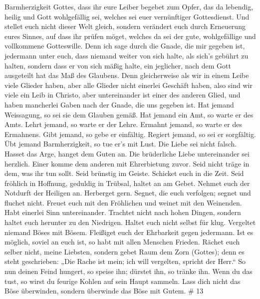 Barmherzigkeit Gottes, dass ihr eure Leiber begebet zum Opfer, das da
lebendig, heilig und Gott wohlgefällig sei, welches sei euer
vernünftiger Gottesdienst.  Und stellet euch nicht dieser
Welt gleich, sondern verändert euch durch Erneuerung eures Sinnes, auf
dass ihr prüfen möget, welches da sei der gute, wohlgefällige und
vollkommene Gotteswille.  Denn ich sage durch die Gnade, die
mir gegeben ist, jedermann unter euch, dass niemand weiter von sich
halte, als sich's gebührt zu halten, sondern dass er von sich mäßig
halte, ein jeglicher, nach dem Gott ausgeteilt hat das Maß des Glaubens.
 Denn gleicherweise als wir in einem Leibe viele Glieder
haben, aber alle Glieder nicht einerlei Geschäft haben, 
also sind wir viele ein Leib in Christo, aber untereinander ist einer
des anderen Glied,  und haben mancherlei Gaben nach der
Gnade, die uns gegeben ist.  Hat jemand Weissagung, so sei
sie dem Glauben gemäß. Hat jemand ein Amt, so warte er des Amts. Lehrt
jemand, so warte er der Lehre.  Ermahnt jemand, so warte er
des Ermahnens. Gibt jemand, so gebe er einfältig. Regiert jemand, so sei
er sorgfältig. Übt jemand Barmherzigkeit, so tue er's mit Lust.
 Die Liebe sei nicht falsch. Hasset das Arge, hanget dem
Guten an.  Die brüderliche Liebe untereinander sei
herzlich. Einer komme dem anderen mit Ehrerbietung zuvor. 
Seid nicht träge in dem, was ihr tun sollt. Seid brünstig im Geiste.
Schicket euch in die Zeit.  Seid fröhlich in Hoffnung,
geduldig in Trübsal, haltet an am Gebet.  Nehmet euch der
Notdurft der Heiligen an. Herberget gern.  Segnet, die euch
verfolgen; segnet und fluchet nicht.  Freuet euch mit den
Fröhlichen und weinet mit den Weinenden.  Habt einerlei
Sinn untereinander. Trachtet nicht nach hohen Dingen, sondern haltet
euch herunter zu den Niedrigen.  Haltet euch nicht selbst
für klug. Vergeltet niemand Böses mit Bösem. Fleißiget euch der
Ehrbarkeit gegen jedermann.  Ist es möglich, soviel an euch
ist, so habt mit allen Menschen Frieden.  Rächet euch
selber nicht, meine Liebsten, sondern gebet Raum dem Zorn (Gottes); denn
es steht geschrieben: „Die Rache ist mein; ich will vergelten, spricht
der Herr.``  So nun deinen Feind hungert, so speise ihn;
dürstet ihn, so tränke ihn. Wenn du das tust, so wirst du feurige Kohlen
auf sein Haupt sammeln.  Lass dich nicht das Böse
überwinden, sondern überwinde das Böse mit Gutem. \# 13 
